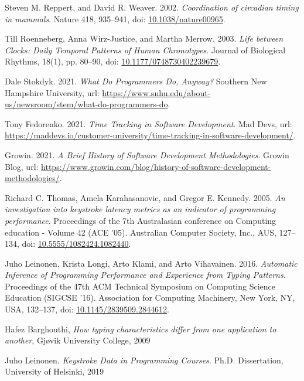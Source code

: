 \begin{thebibliography}{99}

 Steven M. Reppert, and David R. Weaver. 2002. \textit{Coordination of circadian timing in mammals}. Nature 418, 935–941, doi: \href{https://doi.org/10.1038/nature00965}{10.1038/nature00965}.

 Till Roenneberg, Anna Wirz-Justice, and Martha Merrow. 2003. \textit{Life between Clocks: Daily Temporal Patterns of Human Chronotypes}. Journal of Biological Rhythms, 18(1), pp. 80–90, doi: \href{https://doi.org/10.1177/0748730402239679}{10.1177/0748730402239679}.

 Dale Stokdyk. 2021. \textit{What Do Programmers Do, Anyway?} Southern New Hampshire University, url: \url{https://www.snhu.edu/about-us/newsroom/stem/what-do-programmers-do}.

 Tony Fedorenko. 2021. \textit{Time Tracking in Software Development}. Mad Devs, url: \url{https://maddevs.io/customer-university/time-tracking-in-software-development/}.

 Growin. 2021. \textit{A Brief History of Software Development Methodologies}. Growin Blog, url: \url{https://www.growin.com/blog/history-of-software-development-methodologies/}.

 Richard C. Thomas, Amela Karahasanovic, and Gregor E. Kennedy. 2005. \textit{An investigation into keystroke latency metrics as an indicator of programming performance}. Proceedings of the 7th Australasian conference on Computing education - Volume 42 (ACE '05). Australian Computer Society, Inc., AUS, 127–134, doi: \href{https://dl.acm.org/doi/10.5555/1082424.1082440}{10.5555/1082424.1082440}.

 Juho Leinonen, Krista Longi, Arto Klami, and Arto Vihavainen. 2016. \textit{Automatic Inference of Programming Performance and Experience from Typing Patterns}. Proceedings of the 47th ACM Technical Symposium on Computing Science Education (SIGCSE '16). Association for Computing Machinery, New York, NY, USA, 132–137, doi: \href{https://doi.org/10.1145/2839509.2844612}{10.1145/2839509.2844612}.

 Hafez Barghouthi, \textit{How typing characteristics differ from one application to another}, Gjøvik University College, 2009

 Juho Leinonen. \textit{Keystroke Data in Programming Courses}. Ph.D. Dissertation, University of Helsinki, 2019


\end{thebibliography}

